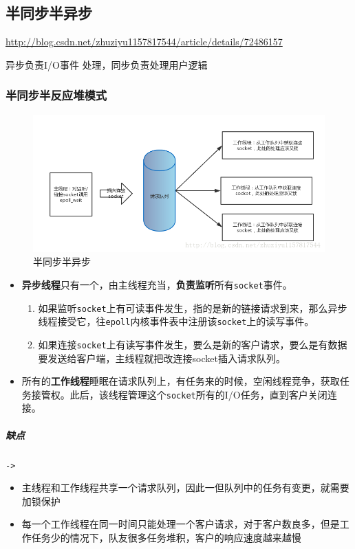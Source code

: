 \documentclass[UTF8,a4paper,12pt]{ctexbook}
\begin{document}
		\subsection{半同步半异步}
			\url{http://blog.csdn.net/zhuziyu1157817544/article/details/72486157}
			
			异步负责I/O事件 处理，同步负责处理用户逻辑
			
			\subsubsection{半同步半反应堆模式}
				\begin{figure}[h]
					\centering
					\includegraphics[scale = 0.5]{figures/half.png}
					\caption{半同步半异步}
				\end{figure}
				
				\begin{itemize}
					\item \textbf{异步线程}只有一个，由主线程充当，\textbf{负责监听}所有\verb|socket|事件。
						\begin{enumerate}
							\item 如果监听\verb|socket|上有可读事件发生，指的是新的链接请求到来，那么异步线程接受它，往\verb|epoll|内核事件表中注册该\verb|socket|上的读写事件。
							\item 如果连接\verb|socket|上有读写事件发生，要么是新的客户请求，要么是有数据要发送给客户端，主线程就把改连接socket插入请求队列。
						\end{enumerate}
					
					\item 所有的\textbf{工作线程}睡眠在请求队列上，有任务来的时候，空闲线程竞争，获取任务接管权。此后，该线程管理这个\verb|socket|所有的I/O任务，直到客户关闭连接。
				\end{itemize}
				
				\subparagraph{缺点}\verb|->|
					\begin{itemize}[itemindent = 1em]
						\item 主线程和工作线程共享一个请求队列，因此一但队列中的任务有变更，就需要加锁保护
						\item 每一个工作线程在同一时间只能处理一个客户请求，对于客户数良多，但是工作任务少的情况下，队友很多任务堆积，客户的响应速度越来越慢
					\end{itemize}
				
\end{document}
